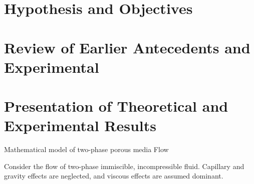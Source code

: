 



\maketitle
\tableofcontents



\section{Hypothesis and Objectives}

\section{Review of Earlier Antecedents and Experimental}


\section{Presentation of Theoretical and Experimental Results}


Mathematical model of two-phase porous media Flow

Consider the flow of two-phase immiscible, incompressible fluid.
Capillary and gravity effects are neglected, and viscous effects are
assumed dominant.

